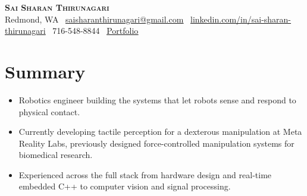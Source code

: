 \documentclass[letterpaper,10pt]{article}
\newcommand{\resumeItem}[1]{
  \begin{itemize}[leftmargin=*,label={\textbullet}, itemsep=-8pt]
    \item {#1}
    \vspace{-8pt}
  \end{itemize}
}
\newcommand{\resumeSectionStart}{\begin{itemize}[leftmargin=0.15in, label={}]}
\newcommand{\resumeSectionEnd}{\end{itemize}\vspace{-5pt}}
\begin{document}
\begin{center}
    {\huge \scshape \textbf{Sai Sharan Thirunagari}}\\
    Redmond, WA \textbar\
    \underline{\href{mailto:saisharanthirunagari@gmail.com}{saisharanthirunagari@gmail.com}} \textbar\
    \underline{\href{https://www.linkedin.com/in/sai-sharan-thirunagari/}{linkedin.com/in/sai-sharan-thirunagari}} \textbar\
    716-548-8844 \textbar\
    \underline{\href{https://sharanio.github.io/sharan/}{Portfolio}}
\end{center}

\section{Summary}
\resumeSectionStart
  \resumeItem{Robotics engineer building the systems that let robots sense and respond to physical contact.} 
  \resumeItem{Currently developing tactile perception for a dexterous manipulation at Meta Reality Labs, previously designed force-controlled manipulation systems for biomedical research.}
  \resumeItem{Experienced across the full stack from hardware design and real-time embedded C++ to computer vision and signal processing.}
\resumeSectionEnd

\end{document}

